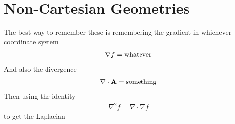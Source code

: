\section{Non-Cartesian Geometries}\label{noncartesian}

The best way to remember these is remembering the gradient in whichever coordinate system
\begin{align}
\nabla f = \rm{whatever}
\end{align}
And also the divergence
\begin{align}
\nabla\cdot\textbf{A} = \rm{something}
\end{align}
Then using the identity
\begin{align}
\nabla^2 f = \nabla\cdot\nabla f
\end{align}
to get the Laplacian


